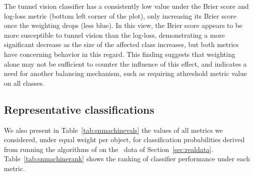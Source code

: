 The tunnel vision classifier has a consistently low value under the Brier score and log-loss metric (bottom left corner of the plot), only increasing its Brier score once the weighting drops (less blue).
In this view, the Brier score appears to be more susceptible to tunnel vision than the log-loss, demonstrating a more significant decrease as the size of the affected class increases, but both metrics have concerning behavior in this regard.
This finding suggests that weighting alone may not be sufficient to counter the influence of this effect, and indicates a need for another balancing mechanism, such as requiring athreshold metric value on all classes.



\subsection{Representative classifications}
\label{sec:realresults}

We also present in Table~\ref{tab:snmachinevals} the values of all metrics we considered, under equal weight per object, for classification probabilities derived from running the algorithms of \cite{lochner_photometric_2016} on the \snphotcc\ data of Section~\ref{sec:realdata}.
Table~\ref{tab:snmachinerank} shows the ranking of classifier performance under each metric.

